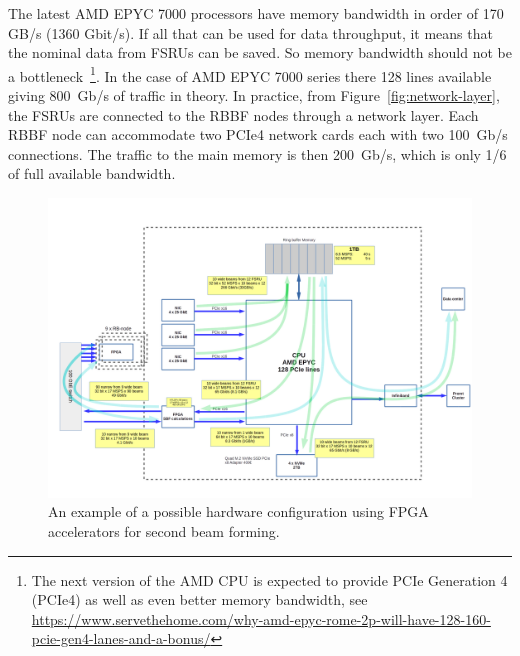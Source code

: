 \documentclass[12pt,a4paper]{article}
\begin{document}
The latest AMD EPYC 7000 processors have memory bandwidth in order of 170 GB/s (1360 Gbit/s).
If all that can be used for data throughput, it means that the nominal data from FSRUs can be saved. 
So memory bandwidth should not be a bottleneck~\footnote{The next version of the AMD CPU is expected to provide PCIe Generation 4 (PCIe4) as well as even better memory bandwidth, see {\url{https://www.servethehome.com/why-amd-epyc-rome-2p-will-have-128-160-pcie-gen4-lanes-and-a-bonus/}}}.  
In the case of AMD EPYC 7000 series there 128 lines available giving
800~Gb/s of traffic in theory.
In practice, from Figure~\ref{fig:network-layer}, the FSRUs are connected to the RBBF nodes through a network layer.
Each RBBF node can accommodate two PCIe4 network cards each with two 100~Gb/s connections.
The traffic to the main memory is then 200~Gb/s, which is only 1/6 of full available bandwidth.  

\begin{figure}[h!]
\includegraphics[scale=0.3]{E3DDS_D2_ring_buffer_node_dataflows.png}
\caption{An example of a possible hardware configuration using FPGA
accelerators for second beam forming.}
\end{figure}
\end{document}
